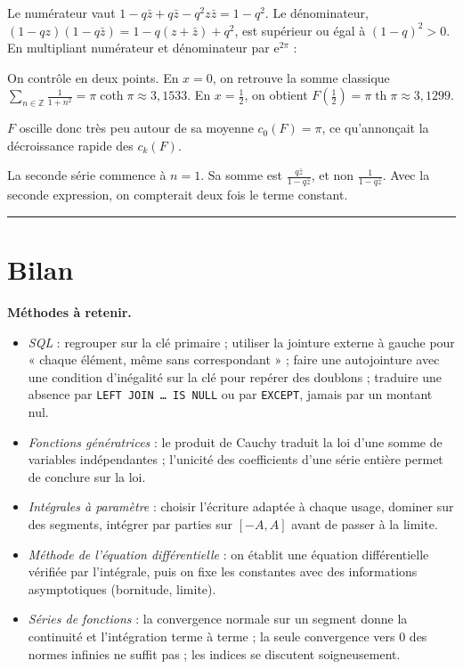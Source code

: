 \documentclass[11pt,a4paper]{article}
\providecommand{\tightlist}{\setlength{\itemsep}{0pt}\setlength{\parskip}{0pt}}
\newcommand{\equationajustee}[1]{%
  \sbox{\boiteequation}{$\displaystyle #1$}%
  \ifdim\wd\boiteequation>\linewidth
    \[\resizebox{\linewidth}{!}{\usebox{\boiteequation}}\]%
  \else
    \[#1\]%
  \fi}
\begin{document}
Le numérateur vaut \(1-q\bar z+q\bar z-q^2z\bar z=1-q^2\). Le dénominateur, \((1-qz)(1-q\bar z)=1-q(z+\bar z)+q^2\), est supérieur ou égal à \((1-q)^2>0\). En multipliant numérateur et dénominateur par \({\mathrm{e}}^{2\pi}\) :

\equationajustee{\boxed{\forall x\in\mathbb{R},\ F(x)=\frac{\pi\operatorname{sh}(2\pi)}{\operatorname{ch}(2\pi)-\cos(2\pi x)}}}

On contrôle en deux points. En \(x=0\), on retrouve la somme classique \(\sum_{n\in\mathbb{Z}}\frac{1}{1+n^2}=\pi\coth\pi\approx3{,}1533\). En \(x=\frac12\), on obtient \(F(\frac12)=\pi\operatorname{th}\pi\approx3{,}1299\).

\(F\) oscille donc très peu autour de sa moyenne \(c_0(F)=\pi\), ce qu'annonçait la décroissance rapide des \(c_k(F)\).

\begin{piege}

La seconde série commence à \(n=1\). Sa somme est \(\frac{q\bar z}{1-q\bar z}\), et non \(\frac{1}{1-q\bar z}\). Avec la seconde expression, on compterait deux fois le terme constant.

\end{piege}

\begin{center}\rule{0.5\linewidth}{0.5pt}\end{center}

\hypertarget{bilan}{%
\section{Bilan}\label{bilan}}

\textbf{Méthodes à retenir.}

\begin{itemize}
\tightlist
\item
  \emph{SQL} : regrouper sur la clé primaire ; utiliser la jointure externe à gauche pour « chaque élément, même sans correspondant » ; faire une autojointure avec une condition d'inégalité sur la clé pour repérer des doublons ; traduire une absence par \texttt{LEFT\ JOIN\ …\ IS\ NULL} ou par \texttt{EXCEPT}, jamais par un montant nul.
\item
  \emph{Fonctions génératrices} : le produit de Cauchy traduit la loi d'une somme de variables indépendantes ; l'unicité des coefficients d'une série entière permet de conclure sur la loi.
\item
  \emph{Intégrales à paramètre} : choisir l'écriture adaptée à chaque usage, dominer sur des segments, intégrer par parties sur \([-A,A]\) avant de passer à la limite.
\item
  \emph{Méthode de l'équation différentielle} : on établit une équation différentielle vérifiée par l'intégrale, puis on fixe les constantes avec des informations asymptotiques (bornitude, limite).
\item
  \emph{Séries de fonctions} : la convergence normale sur un segment donne la continuité et l'intégration terme à terme ; la seule convergence vers 0 des normes infinies ne suffit pas ; les indices se discutent soigneusement.
\end{itemize}
\end{document}
